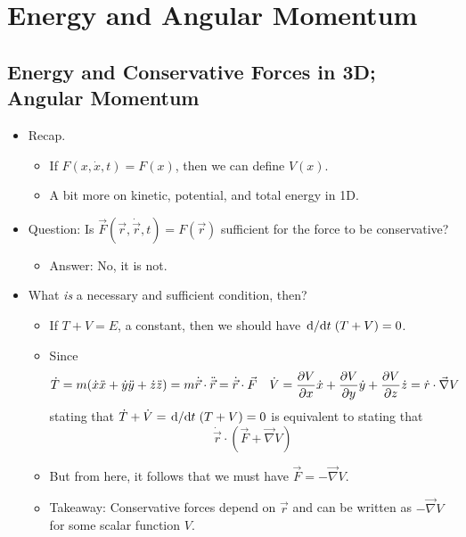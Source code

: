 \documentclass[../notes.tex]{subfiles}
\begin{document}
\chapter{Energy and Angular Momentum}
\section{Energy and Conservative Forces in 3D; Angular Momentum}
\begin{itemize}
    \item {}Recap.
    \begin{itemize}
        \item If $F(x,\dot{x},t)=F(x)$, then we can define $V(x)$.
        \item A bit more on kinetic, potential, and total energy in 1D.
    \end{itemize}
    \item Question: Is $\vec{F}(\vec{r},\dot{\vec{r}},t)=F(\vec{r})$ sufficient for the force to be conservative?
    \begin{itemize}
        \item Answer: No, it is not.
    \end{itemize}
    \item What \emph{is} a necessary and sufficient condition, then?
    \begin{itemize}
        \item If $T+V=E$, a constant, then we should have $\dv*{t}(T+V)=0$.
        \item Since
        \begin{align*}
            \dot{T} &= m(\dot{x}\ddot{x}+\dot{y}\ddot{y}+\dot{z}\ddot{z})
                = m\dot{\vec{r}}\cdot\ddot{\vec{r}}
                = \dot{\vec{r}}\cdot\vec{F}&
            \dot{V} &= \pdv{V}{x}\dot{x}+\pdv{V}{y}\dot{y}+\pdv{V}{z}\dot{z}
            = \dot{r}\cdot\vec{\nabla}V
        \end{align*}
        stating that $\dot{T}+\dot{V}=\dv*{t}(T+V)=0$ is equivalent to stating that
        \begin{equation*}
            \dot{\vec{r}}\cdot(\vec{F}+\vec{\nabla}V)
        \end{equation*}
        \item But from here, it follows that we must have $\vec{F}=-\vec{\nabla}V$.
        \item Takeaway: Conservative forces depend on $\vec{r}$ and can be written as $-\vec{\nabla}V$ for some scalar function $V$.
    \end{itemize}

\end{itemize}
\end{document}
